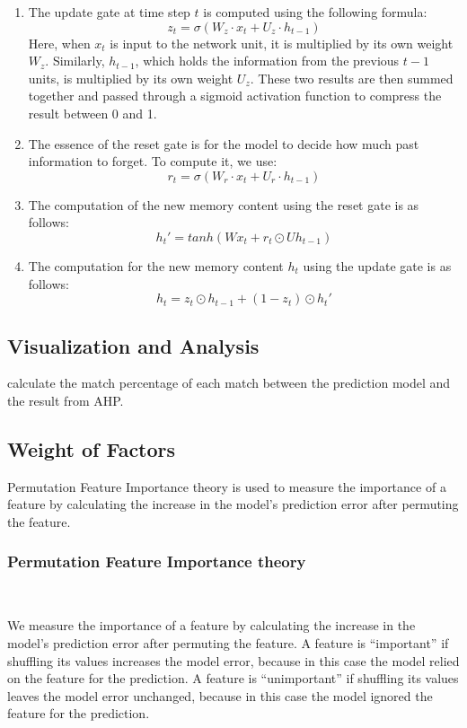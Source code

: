 \begin{enumerate}
    \item 
    The update gate at time step $t$ is computed using the following formula:  
    $$  z_t = \sigma(W_z \cdot x_t + U_z \cdot h_{t-1})  $$  
    Here, when $x_t$ is input to the network unit, 
    it is multiplied by its own weight $W_z$. 
    Similarly, $h_{t-1}$, which holds the information from the previous $t-1$ units, 
    is multiplied by its own weight $U_z$. These two results are then summed together 
    and passed through a sigmoid activation function to compress the result between 0 and 1. 
  
    \item 
    The essence of the reset gate is for the model to decide how much past information to forget. To compute it, we use:  
    $$  r_t = \sigma(W_r \cdot x_t + U_r \cdot h_{t-1})  $$  

    \item 
    The computation of the new memory content using the reset gate is as follows:  
    $$ h_t'= tanh(Wx_t+r_t\odot Uh_{t-1})$$

    \item 
    The computation for the new memory content $h_t$ using the update gate is as follows:  
    $$ h_t=z_t\odot h_{t-1}+(1-z_t)\odot h_t'$$ 
\end{enumerate}



\subsection{Visualization and Analysis}

calculate the match percentage of each match between the prediction model and the result from AHP.

\subsection{Weight of Factors}

Permutation Feature Importance theory is used to measure the importance of a feature by calculating 
the increase in the model's prediction error after permuting the feature.

\subsubsection{Permutation Feature Importance theory}~{}

We measure the importance of a feature by calculating the increase in the model’s prediction error 
after permuting the feature. A feature is “important” if shuffling its values increases the model error, 
because in this case the model relied on the feature for the prediction. A feature is “unimportant” if 
shuffling its values leaves the model error unchanged, because in this case the model ignored the feature 
for the prediction. 

